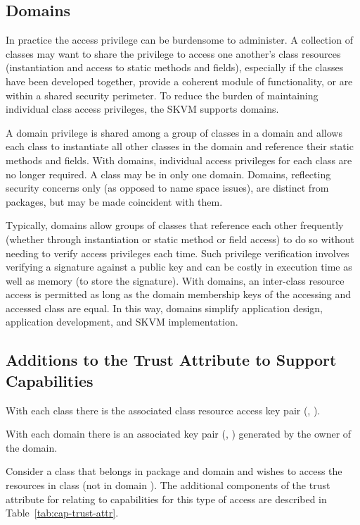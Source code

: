 \documentclass{llncs}
\begin{document}
\subsection{Domains}

In practice the access privilege can be burdensome to administer. A
collection of classes may want to share the privilege to access one
another's class resources (instantiation and access to static methods
and fields), especially if the classes have been developed together,
provide a coherent module of functionality, or are within a shared
security perimeter. To reduce the burden of maintaining individual class
access privileges, the SKVM supports domains.

A domain privilege is shared among a group of classes in a domain and
allows each class to instantiate all other classes in the domain and
reference their static methods and fields. With domains, individual
access privileges for each class are no longer required. A class may be
in only one domain. Domains, reflecting security concerns only (as
opposed to name space issues), are distinct from packages, but may be
made coincident with them.

Typically, domains allow groups of classes that reference each other
frequently (whether through instantiation or static method or field
access) to do so without needing to verify access privileges each time.
Such privilege verification involves verifying a signature against a
public key and can be costly in execution time as well as memory (to
store the signature). With domains, an inter-class resource access is
permitted as long as the domain membership keys of the accessing and
accessed class are equal. In this way, domains simplify application
design, application development, and SKVM implementation.

\subsection{Additions to the Trust Attribute to Support Capabilities}

With each class  there is the associated class resource access key pair
(, ).

With each domain  there is an associated key pair (,
) generated by the owner of the domain.

Consider a class  that belongs in package  and domain  and wishes
to access the resources in class  (not in domain ). The additional
components of the trust attribute for  relating to capabilities for
this type of access are described in Table~\ref{tab:cap-trust-attr}.
\end{document}
